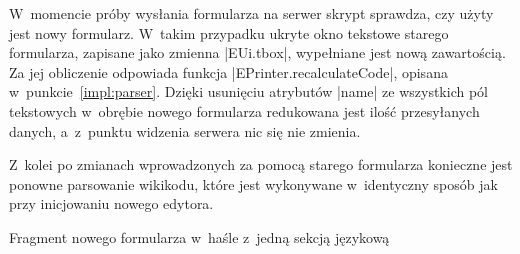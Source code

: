 
W~momencie próby wysłania formularza na serwer skrypt sprawdza, czy użyty jest nowy formularz. W~takim przypadku ukryte okno tekstowe starego formularza, zapisane jako zmienna \kod|EUi.tbox|, wypełniane jest nową zawartością. Za jej obliczenie odpowiada funkcja \kod|EPrinter.recalculateCode|, opisana w~punkcie~\ref{impl:parser}. Dzięki usunięciu atrybutów \kod|name| ze wszystkich pól tekstowych w~obrębie nowego formularza redukowana jest ilość przesyłanych danych, a~z~punktu widzenia serwera nic się nie zmienia.

Z~kolei po zmianach wprowadzonych za pomocą starego formularza konieczne jest ponowne parsowanie wikikodu, które jest wykonywane w~identyczny sposób jak przy inicjowaniu nowego edytora.

\begin{illustration}
	\caption{Fragment nowego formularza w~haśle z~jedną sekcją językową}
	\label{fig:newform}
\end{illustration}

